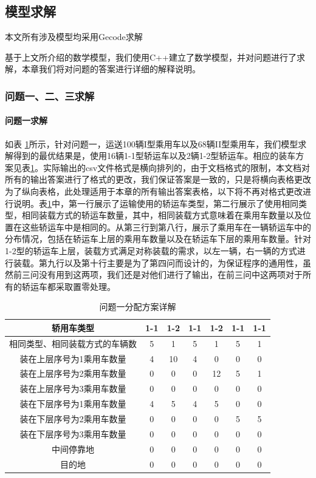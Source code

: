 \documentclass[UTF8，12pt]{ctexart}
\begin{document}
\subsection{模型求解}
本文所有涉及模型均采用Gecode\cite{gecode}求解

基于上文所介绍的数学模型，我们使用C++建立了数学模型，并对问题进行了求解，本章我们将对问题的答案进行详细的解释说明。

\subsubsection{问题一、二、三求解}
\paragraph{问题一求解}

如表 \ref{tab:answer1}所示，针对问题一，运送100辆I型乘用车以及68辆II型乘用车，我们模型求解得到的最优结果是，使用16辆1-1型轿运车以及2辆1-2型轿运车。相应的装车方案见表\ref{tab:answer1}。实际输出的csv文件格式是横向排列的，由于文档格式的限制，本文档对所有的输出答案进行了格式的更改，我们保证答案是一致的，只是将横向表格更改为了纵向表格，此处理适用于本章的所有输出答案表格，以下将不再对格式更改进行说明。表\ref{tab:answer1}中，第一行展示了运输使用的轿运车类型，第二行展示了使用相同类型，相同装载方式的轿运车数量，其中，相同装载方式意味着在乘用车数量以及位置在这些轿运车中是相同的。从第三行到第八行，展示了乘用车在一辆轿运车中的分布情况，包括在轿运车上层的乘用车数量以及在轿运车下层的乘用车数量。针对1-2型的轿运车上层，装载方式满足对称装载的需求，以左一辆，右一辆的方式进行装载。第九行以及第十行主要是为了第四问而设计的，为保证程序的通用性，虽然前三问没有用到这两项，我们还是对他们进行了输出，在前三问中这两项对于所有的轿运车都采取置零处理。

\begin{table}[h!]
\centering
\caption{问题一分配方案详解}\label{tab:answer1}
\begin{tabular}{|c|c|c|c|c|c|c|}
\hline
轿用车类型 & 1-1 & 1-2 & 1-1 & 1-2 & 1-1 & 1-1\\ \hline 
相同类型、相同装载方式的车辆数 & 5 & 1 & 5 & 1 & 5 & 1\\ \hline 
装在上层序号为1乘用车数量 & 4 & 10 & 4 & 0 & 0 & 0\\ \hline 
装在上层序号为2乘用车数量 & 0 & 0 & 0 & 12 & 5 & 1\\ \hline 
装在上层序号为3乘用车数量 & 0 & 0 & 0 & 0 & 0 & 0\\ \hline 
装在下层序号为1乘用车数量 & 4 & 5 & 4 & 5 & 0 & 0\\ \hline 
装在下层序号为2乘用车数量 & 0 & 0 & 0 & 0 & 5 & 5\\ \hline 
装在下层序号为3乘用车数量 & 0 & 0 & 0 & 0 & 0 & 0\\ \hline 
中间停靠地 & 0 & 0 & 0 & 0 & 0 & 0\\ \hline 
目的地 & 0 & 0 & 0 & 0 & 0 & 0\\ \hline
\end{tabular}
\end{table}
\end{document}

